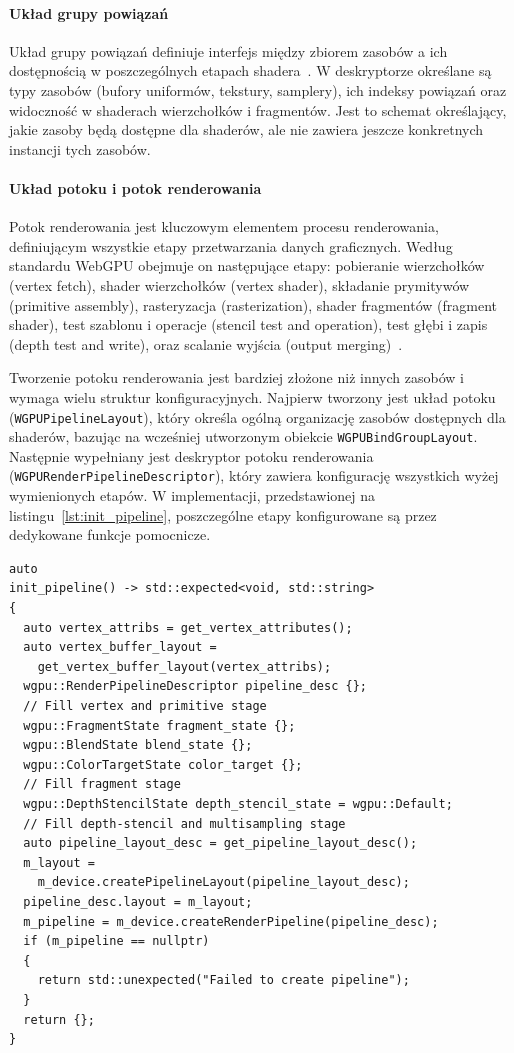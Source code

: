 \paragraph{Układ grupy powiązań}
Układ grupy powiązań definiuje interfejs między zbiorem zasobów a ich dostępnością w poszczególnych etapach shadera~\cite{WebGPU-draft}. W deskryptorze określane są typy zasobów (bufory uniformów, tekstury, samplery), ich indeksy powiązań oraz widoczność w shaderach wierzchołków i fragmentów. Jest to schemat określający, jakie zasoby będą dostępne dla shaderów, ale nie zawiera jeszcze konkretnych instancji tych zasobów.

\paragraph{Układ potoku i potok renderowania}
Potok renderowania jest kluczowym elementem procesu renderowania, definiującym wszystkie etapy przetwarzania danych graficznych. Według standardu WebGPU obejmuje on następujące etapy: pobieranie wierzchołków (vertex fetch), shader wierzchołków (vertex shader), składanie prymitywów (primitive assembly), rasteryzacja (rasterization), shader fragmentów (fragment shader), test szablonu i operacje (stencil test and operation), test głębi i zapis (depth test and write), oraz scalanie wyjścia (output merging)~\cite{WebGPU-draft}.

Tworzenie potoku renderowania jest bardziej złożone niż innych zasobów i wymaga wielu struktur konfiguracyjnych. Najpierw tworzony jest układ potoku (\texttt{WGPUPipelineLayout}), który określa ogólną organizację zasobów dostępnych dla shaderów, bazując na wcześniej utworzonym obiekcie \texttt{WGPUBindGroupLayout}. Następnie wypełniany jest deskryptor potoku renderowania (\texttt{WGPURenderPipelineDescriptor}), który zawiera konfigurację wszystkich wyżej wymienionych etapów. W implementacji, przedstawionej na listingu~\ref{lst:init_pipeline}, poszczególne etapy konfigurowane są przez dedykowane funkcje pomocnicze.
\begin{lstlisting}[caption={Funkcja inicjalizująca obiekt pipeline}, label={lst:init_pipeline}]
auto
init_pipeline() -> std::expected<void, std::string>
{
  auto vertex_attribs = get_vertex_attributes();
  auto vertex_buffer_layout = 
    get_vertex_buffer_layout(vertex_attribs);
  wgpu::RenderPipelineDescriptor pipeline_desc {};
  // Fill vertex and primitive stage
  wgpu::FragmentState fragment_state {};
  wgpu::BlendState blend_state {};
  wgpu::ColorTargetState color_target {};
  // Fill fragment stage
  wgpu::DepthStencilState depth_stencil_state = wgpu::Default;
  // Fill depth-stencil and multisampling stage
  auto pipeline_layout_desc = get_pipeline_layout_desc();
  m_layout = 
    m_device.createPipelineLayout(pipeline_layout_desc);
  pipeline_desc.layout = m_layout;
  m_pipeline = m_device.createRenderPipeline(pipeline_desc);
  if (m_pipeline == nullptr)
  {
    return std::unexpected("Failed to create pipeline");
  }
  return {};
}
\end{lstlisting}

